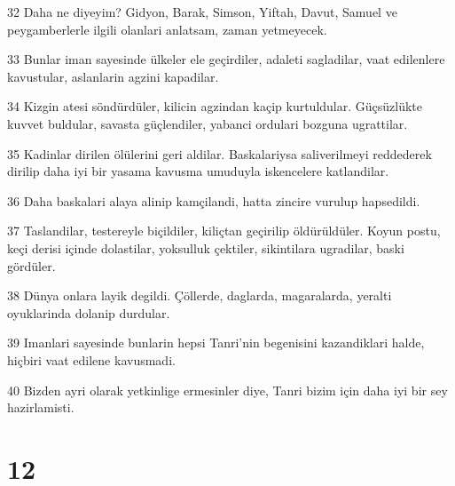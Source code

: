\par 32 Daha ne diyeyim? Gidyon, Barak, Simson, Yiftah, Davut, Samuel ve peygamberlerle ilgili olanlari anlatsam, zaman yetmeyecek.
\par 33 Bunlar iman sayesinde ülkeler ele geçirdiler, adaleti sagladilar, vaat edilenlere kavustular, aslanlarin agzini kapadilar.
\par 34 Kizgin atesi söndürdüler, kilicin agzindan kaçip kurtuldular. Güçsüzlükte kuvvet buldular, savasta güçlendiler, yabanci ordulari bozguna ugrattilar.
\par 35 Kadinlar dirilen ölülerini geri aldilar. Baskalariysa saliverilmeyi reddederek dirilip daha iyi bir yasama kavusma umuduyla iskencelere katlandilar.
\par 36 Daha baskalari alaya alinip kamçilandi, hatta zincire vurulup hapsedildi.
\par 37 Taslandilar, testereyle biçildiler, kiliçtan geçirilip öldürüldüler. Koyun postu, keçi derisi içinde dolastilar, yoksulluk çektiler, sikintilara ugradilar, baski gördüler.
\par 38 Dünya onlara layik degildi. Çöllerde, daglarda, magaralarda, yeralti oyuklarinda dolanip durdular.
\par 39 Imanlari sayesinde bunlarin hepsi Tanri'nin begenisini kazandiklari halde, hiçbiri vaat edilene kavusmadi.
\par 40 Bizden ayri olarak yetkinlige ermesinler diye, Tanri bizim için daha iyi bir sey hazirlamisti.

\chapter{12}

